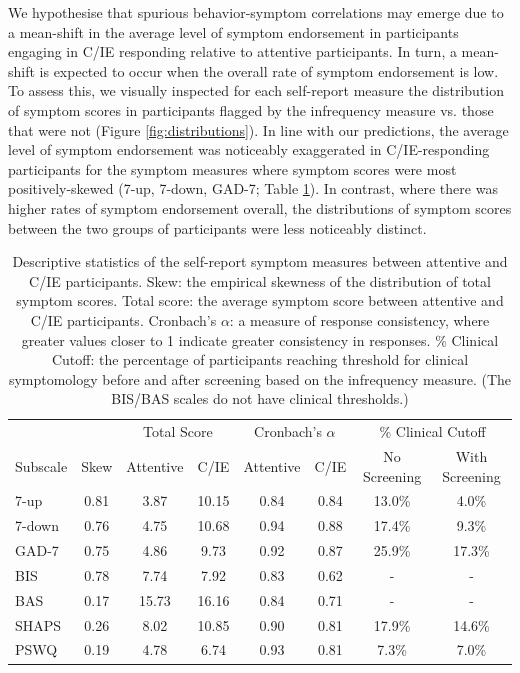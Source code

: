 \documentclass[a4paper,notitlepage,12pt]{article}
\begin{document}
We hypothesise that spurious behavior-symptom correlations may emerge due to a mean-shift in the average level of symptom endorsement in participants engaging in C/IE responding relative to attentive participants. In turn, a mean-shift is expected to occur when the overall rate of symptom endorsement is low. To assess this, we visually inspected for each self-report measure the distribution of symptom scores in participants flagged by the infrequency measure vs. those that were not (Figure \ref{fig:distributions}). In line with our predictions, the average level of symptom endorsement was noticeably exaggerated in C/IE-responding participants for the symptom measures where symptom scores were most positively-skewed (7-up, 7-down, GAD-7; Table \ref{tab:validation}). In contrast, where there was higher rates of symptom endorsement overall, the distributions of symptom scores between the two groups of participants were less noticeably distinct. 

\begin{table}[!t]
\centering
\small
\setlength{\tabcolsep}{6pt}
\begin{tabular}{lccccccc}
\toprule
& & \multicolumn{2}{c}{Total Score} & \multicolumn{2}{c}{Cronbach's $\alpha$} & \multicolumn{2}{c}{\% Clinical Cutoff} \\
\cmidrule(lr){3-4} \cmidrule(lr){5-6} \cmidrule(lr){7-8}
 Subscale & Skew & Attentive & C/IE & Attentive & C/IE & No Screening & With Screening \\
\midrule
7-up   &  0.81 &    3.87 &   10.15 &    0.84 &    0.84 &     13.0\% &      4.0\% \\
7-down &  0.76 &    4.75 &   10.68 &    0.94 &    0.88 &     17.4\% &      9.3\% \\
GAD-7  &  0.75 &    4.86 &    9.73 &    0.92 &    0.87 &     25.9\% &     17.3\% \\
BIS    &  0.78 &    7.74 &    7.92 &    0.83 &    0.62 &        - &        - \\
BAS    &  0.17 &   15.73 &   16.16 &    0.84 &    0.71 &        - &        - \\
SHAPS  &  0.26 &    8.02 &   10.85 &    0.90 &    0.81 &     17.9\% &     14.6\% \\
PSWQ   &  0.19 &    4.78 &    6.74 &    0.93 &    0.81 &      7.3\% &      7.0\% \\
\bottomrule
\end{tabular}
\captionsetup{width=0.88\textwidth}
\caption{Descriptive statistics of the self-report symptom measures between attentive and C/IE participants. Skew: the empirical skewness of the distribution of total symptom scores. Total score: the average symptom score between attentive and C/IE participants. Cronbach's $\alpha$: a measure of response consistency, where greater values closer to 1 indicate greater consistency in responses. \% Clinical Cutoff: the percentage of participants reaching threshold for clinical symptomology before and after screening based on the infrequency measure. (The BIS/BAS scales do not have clinical thresholds.)}
\label{tab:validation}
\end{table}
\end{document}
